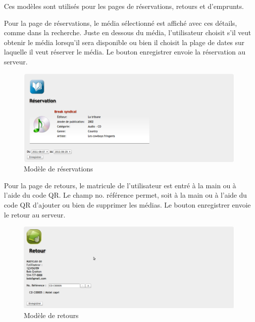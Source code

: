\documentclass[letter, 11pt]{report}
\begin{document}
Ces modèles sont utilisés pour les pages de réservations, retours et d'emprunts. 

Pour la page de réservations, le média sélectionné est affiché avec ces détails, comme dans la recherche. Juste en dessous du média, l'utilisateur choisit s'il veut obtenir le média lorsqu'il sera disponible ou bien il choisit la plage de dates sur laquelle il veut réserver le média. Le bouton enregistrer envoie la réservation au serveur.

\begin{figure}[htbp]
	\begin{center}
		\includegraphics[scale=0.25]{captures_ecran/reservation.png}
	\end{center}
	\caption{Modèle de réservations}
\end{figure}

Pour la page de retours, le matricule de l'utilisateur est entré à la main ou à l'aide du code QR. Le champ no. référence permet, soit à la main ou à l'aide du code QR d'ajouter ou bien de supprimer les médias. Le bouton enregistrer envoie le retour au serveur.

\begin{figure}[htbp]
	\begin{center}
		\includegraphics[scale=0.25]{captures_ecran/retour.png}
	\end{center}
	\caption{Modèle de retours}
\end{figure}
\end{document}
